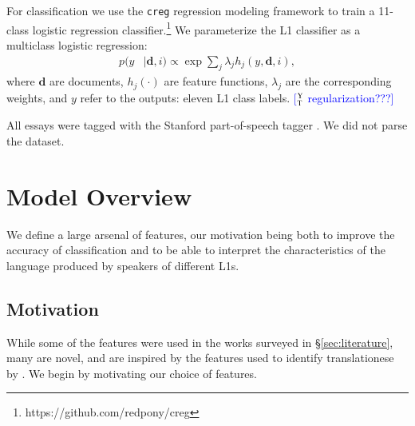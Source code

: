 \documentclass[11pt,letterpaper]{article}
\newcommand{\ensuretext}[1]{#1}
\newcommand{\ytmarker}{\ensuretext{\textcolor{blue}{\ensuremath{^{\textsc{Y}}_{\textsc{T}}}}}}
\newcommand{\arkcomment}[3]{\ensuretext{\textcolor{#3}{[#1 #2]}}}
\newcommand{\yt}[1]{\arkcomment{\ytmarker}{#1}{blue}}
\newcommand{\Sref}[1]{\S\ref{#1}}
\begin{document}
For classification we use the \texttt{creg} regression modeling framework to train a 11-class logistic regression classifier.\footnote{https://github.com/redpony/creg}  We parameterize the L1 classifier as a multiclass logistic regression:
\begin{align*}
p(y& \mid \textbf{d}, i) \propto \exp \sum_j \lambda_j h_j(y, \textbf{d}, i) ,
\end{align*}
where $\textbf{d}$ are documents, $h_j(\cdot)$ are feature functions, $\lambda_j$ are the corresponding weights, and $y$ refer to the outputs: eleven L1 class labels. \yt{regularization???}  



All essays were tagged with the Stanford part-of-speech tagger
\citep{toutanova-03}. We did not parse the dataset.

\section{Model Overview}
\label{sec:features}
We define a large arsenal of features, our motivation being both to
improve the accuracy of classification and to be able to interpret the
characteristics of the language produced by speakers of different
L1s.

\subsection{Motivation}
While some of the features were used in the works surveyed in
\Sref{sec:literature}, many are novel, and are inspired by the
features used to identify translationese by \citet{vered:noam:shuly}.
We begin by motivating our choice of features.
\end{document}
